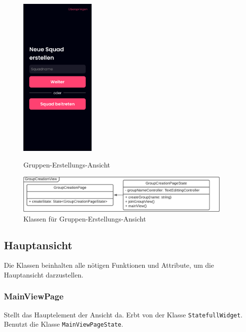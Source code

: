 \documentclass[parskip=full]{scrartcl}
\begin{document}
    \begin{figure}[htp]
        \begin{minipage}
            [t]{0.49\textwidth}
            \centering
            \includegraphics[height=80mm]{images/Presentation-layer/GroupCreationView.jpg}
            \caption{Gruppen-Erstellungs-Ansicht}
        \end{minipage}
        \begin{minipage}
            [t]{0.49\textwidth}
            \centering
            \includegraphics[width=0.95\textwidth]{images/Presentation-layer/GroupCreationViewClass.pdf}
            \caption{Klassen für Gruppen-Erstellungs-Ansicht}
        \end{minipage}
    \end{figure}    
        
    \newpage

\subsection{Hauptansicht}
    Die Klassen beinhalten alle nötigen Funktionen und Attribute, um die Hauptansicht darzustellen.

    \subsubsection{MainViewPage}
        Stellt das Hauptelement der Ansicht da. Erbt von der Klasse \texttt{StatefullWidget}. Benutzt die Klasse \texttt{MainViewPageState}. 
\end{document}
